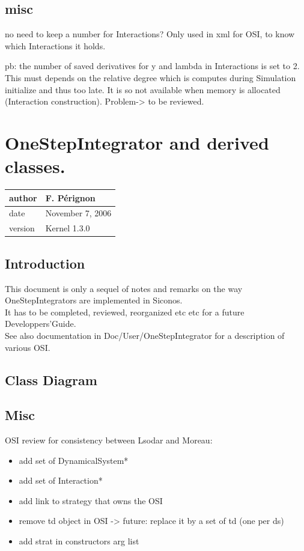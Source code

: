 \documentclass[10pt]{report}
\begin{document}
\ei

\section{misc}

\bei 
\item no need to keep a number for Interactions? Only used in xml for OSI, to know which Interactions it holds.
\item pb: the number of saved derivatives for y and lambda in Interactions is set to 2. This must depends on the relative degree which is computes during
Simulation initialize and thus too late. It is so not available when memory is allocated (Interaction construction). Problem-> to be reviewed.
\ei 


\chapter{OneStepIntegrator and derived classes.}
\begin{table}[!ht]
  \begin{tabular}{|l|l|}
    \hline
    author  & F.  P\'erignon \\
    \hline
    date    & November 7, 2006 \\ 
    \hline
    version & Kernel 1.3.0 \\
    \hline
  \end{tabular}
\end{table}

\section{Introduction}
This document is only a sequel of notes and remarks on the way OneStepIntegrators are implemented in Siconos.\\
It has to be completed, reviewed, reorganized etc etc for a future Developpers'Guide. \\
See also documentation in Doc/User/OneStepIntegrator for a description of various OSI.

\section{Class Diagram}

\section{Misc}

OSI review for consistency between Lsodar and Moreau:
\begin{itemize}
\item add set of DynamicalSystem*
\item add set of Interaction* 
\item add link to strategy that owns the OSI
\item remove td object in OSI -> future: replace it by a set of td (one per ds)
\item add strat in constructors arg list
\end{itemize}
\end{document}
